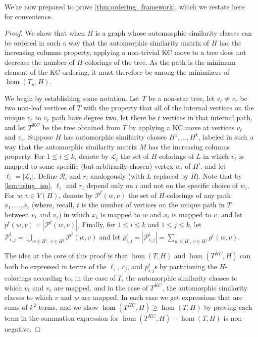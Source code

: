 \documentclass[11pt]{article}
\theoremstyle{definition}
\begin{document}
We're now prepared to prove \cref{thm:ordering_framework}, which we restate here for convenience.

\orderings*

\begin{proof}
We show that when $H$ is a graph whose automorphic similarity classes can be ordered in such a way that the automorphic similarity matrix of $H$ has the increasing columns property, applying a non-trivial KC move to a tree does not decrease the number of $H$-colorings of the tree. As the path is the minimum element of the KC ordering, it must therefore be among the minimizers of $\hom(T_n,H)$.

We begin by establishing some notation. Let $T$ be a non-star tree, let $v_\ell \ne v_r$ be two non-leaf vertices of $T$ with the property that all of the internal vertices on the unique $v_\ell$ to $v_r$ path have degree two, let there be $t$ vertices in that internal path, and let $T^{KC}$ be the tree obtained from $T$ by applying a KC move at vertices $v_\ell$ and $v_r$. Suppose $H$ has automorphic similarity classes $H^1, \ldots, H^k$, labeled in such a way that the automorphic similarity matrix $M$ has the increasing columns property. For $1 \le i \le k$, denote by ${\mathcal L}_i$ the set of $H$-colorings of $L$ in which $v_\ell$ is mapped to some specific (but arbitrarily chosen) vertex $w_i$ of $H^i$, and let $\ell_i=|{\mathcal L}_i|$. Define ${\mathcal R}_i$ and $r_i$ analogously (with $L$ replaced by $R$). Note that by \cref{lem:using_iso}, $\ell_i$ and $r_i$ depend only on $i$ and not on the specific choice of $w_i$. For $w, v \in V(H)$, denote by ${\mathcal P}^t(w,v)$ the set of $H$-colorings of any path $x_1, \ldots, x_t$ (where, recall, $t$ is the number of vertices on the unique path in $T$ between $v_\ell$ and $v_r$) in which $x_1$ is mapped to $w$ and $x_t$ is mapped to $v$, and let $p^t(w,v)=|{\mathcal P}^t(w,v)|$. Finally, for $1 \le i \le k$ and $1 \le j \le k$, let ${\mathcal P}^t_{i,j} = \bigcup_{w \in H^i,~ v \in H^j} {\mathcal P}^t(w,v)$ and let $p^t_{i,j}=|{\mathcal P}^t_{i,j}| =\sum_{w \in H^i,~v \in H^j} p^t(w,v)$. 

The idea at the core of this proof is that $\hom(T,H)$ and $\hom(T^{KC},H)$ can both be expressed in terms of the $\ell_i$, $r_j$, and $p^t_{i,j}$s by partitioning the $H$-colorings according to, in the case of $T$, the automorphic similarity classes to which $v_\ell$ and $v_r$ are mapped, and in the case of $T^{KC}$, the automorphic similarity classes to which $v$ and $w$ are mapped. In each case we get expressions that are sums of $k^2$ terms, and we show $\hom(T^{KC},H) \ge \hom(T,H)$ by proving each term in the summation expression for $\hom(T^{KC},H) - \hom(T,H)$ is non-negative.


\end{proof}
\end{document}
